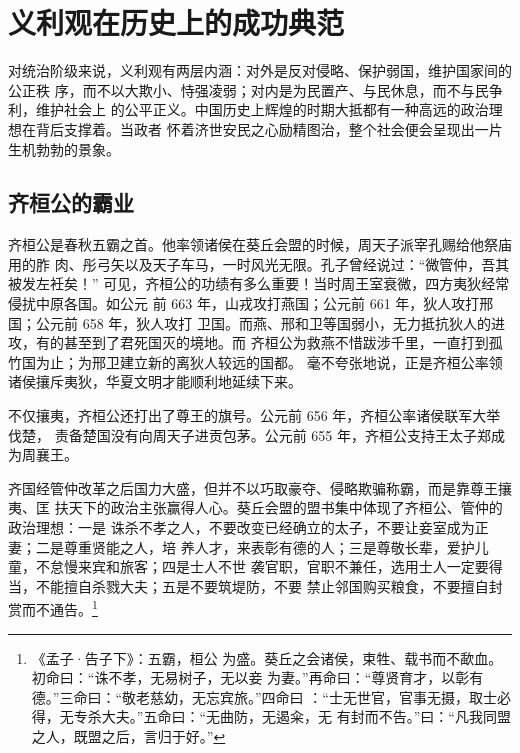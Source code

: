 \section{义利观在历史上的成功典范}

对统治阶级来说，义利观有两层内涵：对外是反对侵略、保护弱国，维护国家间的公正秩
序，而不以大欺小、恃强凌弱；对内是为民置产、与民休息，而不与民争利，维护社会上
的公平正义。中国历史上辉煌的时期大抵都有一种高远的政治理想在背后支撑着。当政者
怀着济世安民之心励精图治，整个社会便会呈现出一片生机勃勃的景象。

\subsection{齐桓公的霸业}

齐桓公是春秋五霸之首。他率领诸侯在葵丘会盟的时候，周天子派宰孔赐给他祭庙用的胙
肉、彤弓矢以及天子车马，一时风光无限。孔子曾经说过：“微管仲，吾其被发左衽矣！”
可见，齐桓公的功绩有多么重要！当时周王室衰微，四方夷狄经常侵扰中原各国。如公元
前 663 年，山戎攻打燕国；公元前 661 年，狄人攻打邢国；公元前 658 年，狄人攻打
卫国。而燕、邢和卫等国弱小，无力抵抗狄人的进攻，有的甚至到了君死国灭的境地。而
齐桓公为救燕不惜跋涉千里，一直打到孤竹国为止；为邢卫建立新的离狄人较远的国都。
毫不夸张地说，正是齐桓公率领诸侯攘斥夷狄，华夏文明才能顺利地延续下来。

不仅攘夷，齐桓公还打出了尊王的旗号。公元前 656 年，齐桓公率诸侯联军大举伐楚，
责备楚国没有向周天子进贡包茅。公元前 655 年，齐桓公支持王太子郑成为周襄王。

齐国经管仲改革之后国力大盛，但并不以巧取豪夺、侵略欺骗称霸，而是靠尊王攘夷、匡
扶天下的政治主张赢得人心。葵丘会盟的盟书集中体现了齐桓公、管仲的政治理想：一是
诛杀不孝之人，不要改变已经确立的太子，不要让妾室成为正妻；二是尊重贤能之人，培
养人才，来表彰有德的人；三是尊敬长辈，爱护儿童，不怠慢来宾和旅客；四是士人不世
袭官职，官职不兼任，选用士人一定要得当，不能擅自杀戮大夫；五是不要筑堤防，不要
禁止邻国购买粮食，不要擅自封赏而不通告。\footnote{《孟子·告子下》：五霸，桓公
    为盛。葵丘之会诸侯，束牲、载书而不歃血。初命曰：“诛不孝，无易树子，无以妾
    为妻。”再命曰：“尊贤育才，以彰有德。”三命曰：“敬老慈幼，无忘宾旅。”四命曰
    ：“士无世官，官事无摄，取士必得，无专杀大夫。”五命曰：“无曲防，无遏籴，无
    有封而不告。”曰：“凡我同盟之人，既盟之后，言归于好。”}

